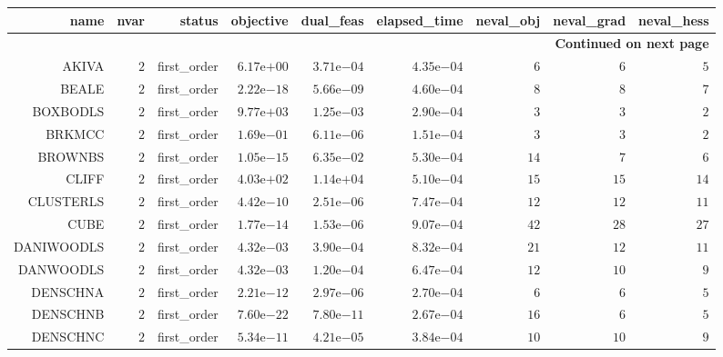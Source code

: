 \begin{longtable}{rrrrrrrrr}
\hline
name & nvar & status & objective & dual\_feas & elapsed\_time & neval\_obj & neval\_grad & neval\_hess \\\hline
\endhead
\hline
\multicolumn{9}{r}{{\bfseries Continued on next page}}\\
\hline
\endfoot
\endlastfoot
AKIVA & \(     2\) & first\_order & \( 6.17\)e\(+00\) & \( 3.71\)e\(-04\) & \( 4.35\)e\(-04\) & \(     6\) & \(     6\) & \(     5\) \\
BEALE & \(     2\) & first\_order & \( 2.22\)e\(-18\) & \( 5.66\)e\(-09\) & \( 4.60\)e\(-04\) & \(     8\) & \(     8\) & \(     7\) \\
BOXBODLS & \(     2\) & first\_order & \( 9.77\)e\(+03\) & \( 1.25\)e\(-03\) & \( 2.90\)e\(-04\) & \(     3\) & \(     3\) & \(     2\) \\
BRKMCC & \(     2\) & first\_order & \( 1.69\)e\(-01\) & \( 6.11\)e\(-06\) & \( 1.51\)e\(-04\) & \(     3\) & \(     3\) & \(     2\) \\
BROWNBS & \(     2\) & first\_order & \( 1.05\)e\(-15\) & \( 6.35\)e\(-02\) & \( 5.30\)e\(-04\) & \(    14\) & \(     7\) & \(     6\) \\
CLIFF & \(     2\) & first\_order & \( 4.03\)e\(+02\) & \( 1.14\)e\(+04\) & \( 5.10\)e\(-04\) & \(    15\) & \(    15\) & \(    14\) \\
CLUSTERLS & \(     2\) & first\_order & \( 4.42\)e\(-10\) & \( 2.51\)e\(-06\) & \( 7.47\)e\(-04\) & \(    12\) & \(    12\) & \(    11\) \\
CUBE & \(     2\) & first\_order & \( 1.77\)e\(-14\) & \( 1.53\)e\(-06\) & \( 9.07\)e\(-04\) & \(    42\) & \(    28\) & \(    27\) \\
DANIWOODLS & \(     2\) & first\_order & \( 4.32\)e\(-03\) & \( 3.90\)e\(-04\) & \( 8.32\)e\(-04\) & \(    21\) & \(    12\) & \(    11\) \\
DANWOODLS & \(     2\) & first\_order & \( 4.32\)e\(-03\) & \( 1.20\)e\(-04\) & \( 6.47\)e\(-04\) & \(    12\) & \(    10\) & \(     9\) \\
DENSCHNA & \(     2\) & first\_order & \( 2.21\)e\(-12\) & \( 2.97\)e\(-06\) & \( 2.70\)e\(-04\) & \(     6\) & \(     6\) & \(     5\) \\
DENSCHNB & \(     2\) & first\_order & \( 7.60\)e\(-22\) & \( 7.80\)e\(-11\) & \( 2.67\)e\(-04\) & \(    16\) & \(     6\) & \(     5\) \\
DENSCHNC & \(     2\) & first\_order & \( 5.34\)e\(-11\) & \( 4.21\)e\(-05\) & \( 3.84\)e\(-04\) & \(    10\) & \(    10\) & \(     9\) \\

\end{longtable}
